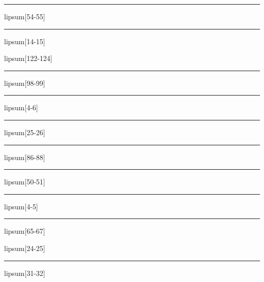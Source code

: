 \documentclass[11pt,a4paper]{article}
\begin{document}
\begin{simplewrap}
  \textcolor{olive!59}{\rule{4.1cm}{7.3cm}}
\end{simplewrap}
lipsum[54-55]

\begin{simplewrap}
  \textcolor{lime!13}{\rule{4.9cm}{8.0cm}}
\end{simplewrap}
lipsum[14-15]

lipsum[122-124]

\begin{simplewrap}
  \textcolor{violet!40}{\rule{5.2cm}{8.0cm}}
\end{simplewrap}
lipsum[98-99]

\begin{simplewrap}
  \textcolor{pink!40}{\rule{3.8cm}{6.2cm}}
\end{simplewrap}
lipsum[4-6]

\begin{simplewrap}
  \textcolor{blue!34}{\rule{5.0cm}{9.7cm}}
\end{simplewrap}
lipsum[25-26]

\begin{simplewrap}
  \textcolor{lime!37}{\rule{4.8cm}{7.2cm}}
\end{simplewrap}
lipsum[86-88]

\begin{simplewrap}
  \textcolor{orange!26}{\rule{5.0cm}{5.1cm}}
\end{simplewrap}
lipsum[50-51]

\begin{simplewrap}
  \textcolor{cyan!30}{\rule{4.6cm}{7.4cm}}
\end{simplewrap}
lipsum[4-5]

\begin{simplewrap}
  \textcolor{cyan!16}{\rule{5.1cm}{4.8cm}}
\end{simplewrap}
lipsum[65-67]

lipsum[24-25]

\begin{simplewrap}
  \textcolor{blue!48}{\rule{5.0cm}{8.7cm}}
\end{simplewrap}
lipsum[31-32]
\end{document}
